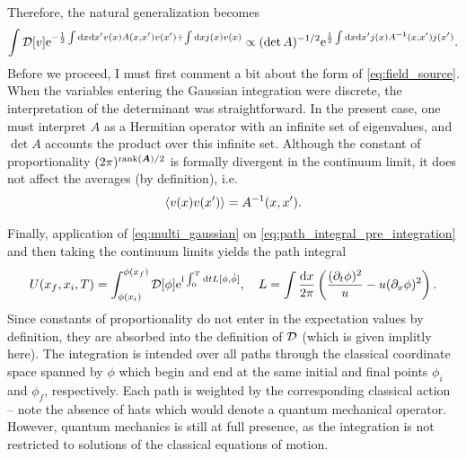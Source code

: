 Therefore, the natural generalization becomes
\begin{align}
    \int\mathcal D[v]\mathrm e^{-\frac12\int\mathrm d x\mathrm d x' v(x)A(x,x')v(x')+\int\mathrm d x j(x) v(x)}
    \propto
    (\det A)^{-1/2}\mathrm e^{\frac12\int\mathrm d x\mathrm d x' j(x) A^{-1}(x,x')j(x')}.
    \label{eq:field_source}
\end{align}
Before we proceed, I must first comment a bit about the form of \cref{eq:field_source}.
When the variables entering the Gaussian integration were discrete, the interpretation of the determinant was straightforward.
In the present case, one must interpret $A$ as a Hermitian operator with an infinite set of eigenvalues, and $\det A$ accounts the product over this infinite set.
Although the constant of proportionality $(2\pi)^{{\rm rank}(\bm A)/2}$ is formally divergent in the continuum limit, it does not affect the averages (by definition), i.e.
\begin{align}
    \braket{v(x)v(x')} = A^{-1}(x,x').
\end{align}

Finally, application of \cref{eq:multi_gaussian} on \cref{eq:path_integral_pre_integration} and then taking the continuum limits yields the path integral
\begin{align}
    U(x_f,x_i,T)
    =
    \int_{\phi(x_i)}^{\phi(x_f)}{\mathcal D[\phi]}
    \mathrm e^{\mathrm i\int_0^T\mathrm d tL[\phi,\dot\phi]}
    ,\quad
    L = \int\frac{\mathrm d x}{2\pi}\left( \frac{(\partial_t\phi)^2}{u}-u(\partial_x\phi)^2 \right).
    \label{eq:kg_lagrangian}
\end{align}
Since constants of proportionality do not enter in the expectation values by definition, they are absorbed into the definition of $\mathcal D$ (which is given implitly here).
The integration is intended over all paths through the classical coordinate space spanned by $\phi$ which begin and end at the same initial and final points $\phi_i$ and $\phi_f$, respectively.
Each path is weighted by the corresponding classical action -- note the absence of hats which would denote a quantum mechanical operator.
However, quantum mechanics is still at full presence, as the integration is not restricted to solutions of the classical equations of motion.

